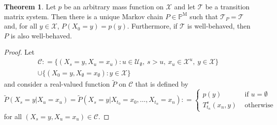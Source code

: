 \documentclass[10pt]{paper}
\theoremstyle{definition}
\newtheorem{theorem}{Theorem}
\newcommand{\states}{\mathcal{X}}
\newcommand{\processes}{\mathbb{P}}
\newcommand{\mprocesses}{\processes^{\mathrm{M}}}
\newcommand{\coloneqq}{:\!=}
\begin{document}
\begin{theorem}\label{theo:uniqueMarkovchain}
 Let $p$ be an arbitrary mass function on $\states$ and let $\mathcal{T}$ be a transition matrix system. Then there is a unique Markov chain $P\in\mprocesses$ such that $\mathcal{T}_P=\mathcal{T}$ and, for all $y\in\states$, $P(X_0=y)=p(y)$. Furthermore, if $\mathcal{T}$ is well-behaved, then $P$ is also well-behaved.
\end{theorem}
\begin{proof}
Let
\begin{multline*}
\mathcal{C}\coloneqq\{
(X_s=y,X_u=x_u)
\colon 
u\in\mathcal{U}_\emptyset,~s>u,~x_u\in\states^u,~y\in\states
\}\\
\cup
\{
(X_0=y,X_\emptyset=x_\emptyset)\colon y\in\states
\}
\end{multline*}
and consider a real-valued function $\tilde{P}$ on $\mathcal{C}$ that is defined by 
\begin{equation*}
\tilde{P}(X_s=y\vert X_u=x_u)
=
\tilde{P}(X_s=y\vert X_{t_0}=x_{0}, \dots, X_{t_n}=x_{n})
\coloneqq
\begin{cases}
p(y)&\text{~if $u=\emptyset$}\\
T_{t_n}^s(x_n,y)&\text{~otherwise}
\end{cases}
\end{equation*}
for all $(X_s=y,X_u=x_u)\in\mathcal{C}$.



\end{proof}
\end{document}
